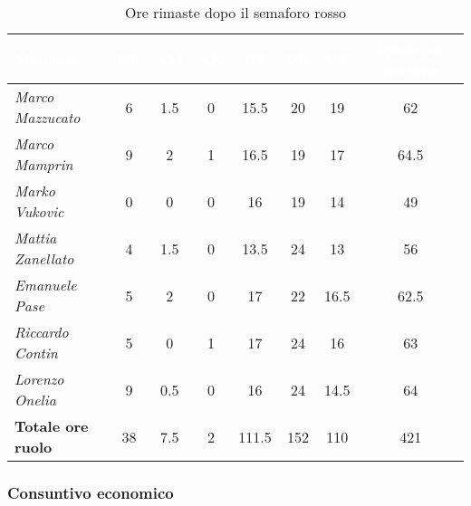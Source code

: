 \begin{table}[H]
    \renewcommand\arraystretch{1.5}
    \centering
    \begin{tabular}{|l|c|c|c|c|c|c|c|}
    \hline
    \rowcolor[HTML]{036400}
    \textcolor{white}{\textbf{Membro}} & \multicolumn{1}{c|}{\textcolor{white}{\textbf{RE}}} & \multicolumn{1}{c|}{\textcolor{white}{\textbf{AM}}} & \multicolumn{1}{c|}{\textcolor{white}{\textbf{AN}}} & \multicolumn{1}{c|}{\textcolor{white}{\textbf{PT}}} & \multicolumn{1}{c|}{\textcolor{white}{\textbf{PR}}} & \multicolumn{1}{c|}{\textcolor{white}{\textbf{VE}}} & \multicolumn{1}{c|}{\textcolor{white}{\textbf{Totale ore persona}}} \\ \hline
    \rowcolor[HTML]{EFEFEF}\textit{Marco Mazzucato}  & 6  & 1.5  & 0     & 15.5  & 20  & 19     & 62     \\ \hline
    \rowcolor[HTML]{C0C0C0}\textit{Marco Mamprin}    & 9  & 2    & 1     & 16.5  & 19  & 17     & 64.5     \\ \hline
    \rowcolor[HTML]{EFEFEF}\textit{Marko Vukovic}    & 0  & 0    & 0     & 16    & 19  & 14     & 49     \\ \hline
    \rowcolor[HTML]{C0C0C0}\textit{Mattia Zanellato} & 4  & 1.5  & 0     & 13.5  & 24  & 13     & 56     \\ \hline
    \rowcolor[HTML]{EFEFEF}\textit{Emanuele Pase}    & 5  & 2    & 0     & 17    & 22  & 16.5   & 62.5     \\ \hline
    \rowcolor[HTML]{C0C0C0}\textit{Riccardo Contin}  & 5  & 0    & 1     & 17    & 24  & 16     & 63     \\ \hline
    \rowcolor[HTML]{EFEFEF}\textit{Lorenzo Onelia}   & 9  & 0.5  & 0     & 16    & 24  & 14.5   & 64     \\ \hline
    \rowcolor[HTML]{C0C0C0}\textbf{Totale ore ruolo} & 38 & 7.5  & 2     & 111.5 & 152 & 110    & 421    \\ \hline
    \end{tabular}
    \caption{Ore rimaste dopo il semaforo rosso}
\end{table}

\subsubsection{Consuntivo economico}

